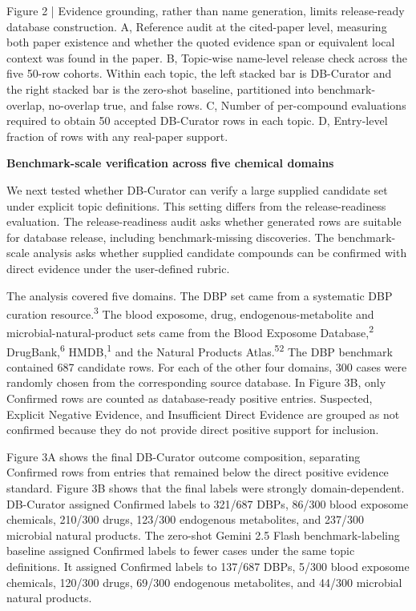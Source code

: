 \documentclass[
]{article}
\begin{document}
Figure 2 | Evidence grounding, rather than name generation, limits
release-ready database construction. A, Reference audit at the
cited-paper level, measuring both paper existence and whether the quoted
evidence span or equivalent local context was found in the paper. B,
Topic-wise name-level release check across the five 50-row cohorts. Within
each topic, the left stacked bar is DB-Curator and the right stacked bar
is the zero-shot baseline, partitioned into benchmark-overlap,
no-overlap true, and false rows. C, Number of per-compound evaluations
required to obtain 50 accepted DB-Curator rows in each topic. D,
Entry-level fraction of rows with any real-paper support.

\textbf{Benchmark-scale verification across five chemical domains}

We next tested whether DB-Curator can verify a large supplied candidate
set under explicit topic definitions. This setting differs from the
release-readiness evaluation. The release-readiness audit asks whether
generated rows are suitable for database release, including
benchmark-missing discoveries. The benchmark-scale analysis asks whether
supplied candidate compounds can be confirmed with direct evidence under
the user-defined rubric.

The analysis covered five domains. The DBP set came from a systematic
DBP curation resource.\textsuperscript{3} The blood exposome, drug,
endogenous-metabolite and microbial-natural-product sets came from the
Blood Exposome Database,\textsuperscript{2} DrugBank,\textsuperscript{6}
HMDB,\textsuperscript{1} and the Natural Products Atlas.\textsuperscript{52}
The DBP benchmark contained 687 candidate rows. For each of the other four
domains, 300 cases were randomly chosen from the corresponding source
database. In Figure 3B, only Confirmed rows are counted as
database-ready positive entries. Suspected, Explicit Negative Evidence,
and Insufficient Direct Evidence are grouped as not confirmed because
they do not provide direct positive support for inclusion.

Figure 3A shows the final DB-Curator outcome composition, separating
Confirmed rows from entries that remained below the direct positive
evidence standard. Figure 3B shows that the final labels were strongly
domain-dependent. DB-Curator assigned Confirmed labels to 321/687 DBPs,
86/300 blood exposome chemicals, 210/300 drugs, 123/300 endogenous
metabolites, and 237/300 microbial natural products. The zero-shot
Gemini 2.5 Flash benchmark-labeling baseline assigned Confirmed labels
to fewer cases under the same topic definitions. It assigned Confirmed
labels to 137/687 DBPs, 5/300 blood exposome chemicals, 120/300 drugs,
69/300 endogenous metabolites, and 44/300 microbial natural products.
\end{document}

